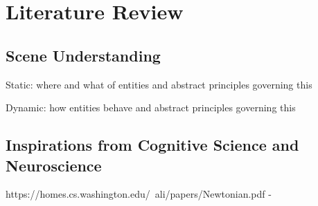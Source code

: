 \section{Literature Review}

\subsection{Scene Understanding}
Static: where and what of entities and abstract principles governing this

Dynamic: how entities behave and abstract principles governing this

\subsection{Inspirations from Cognitive Science and Neuroscience}



https://homes.cs.washington.edu/~ali/papers/Newtonian.pdf
    - 